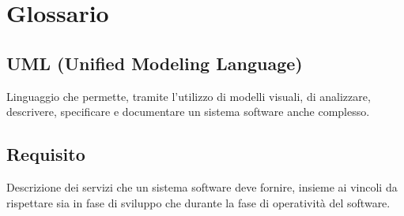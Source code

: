 \cleardoublepage
\chapter{Glossario}

\nocite{*}

\section*{UML (Unified Modeling Language)}
\label{cap:uml-definition}
Linguaggio che permette, tramite l'utilizzo di modelli visuali, di analizzare, descrivere, specificare e documentare un sistema software anche complesso.

\section*{Requisito}
\label{cap:requisito-definition}
Descrizione dei servizi che un sistema software deve fornire, insieme ai vincoli da rispettare sia in fase di sviluppo che durante la fase di operatività del software.

